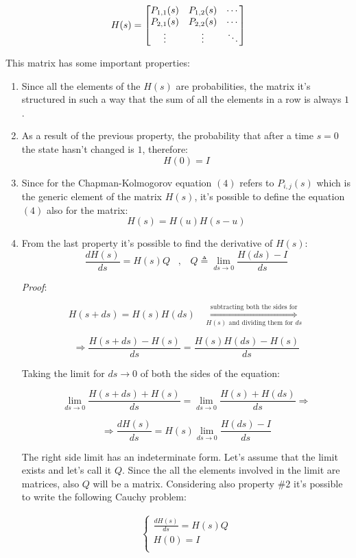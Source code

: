 \documentclass[12pt,a4paper]{article}
\begin{document}
\bigskip\noindent
$$
H(s)=\left[
\begin{matrix}
P_{1,1}(s)&P_{1,2}(s)&\cdots\cr
P_{2,1}(s)&P_{2,2}(s)&\cdots\cr
\vdots&\vdots&\ddots
\end{matrix}
\right]
$$

\bigskip\noindent
This matrix has some important properties:
\begin{enumerate}
\item Since all the elements of the $H(s)$ are probabilities, the matrix it's structured in such a way that the sum of all the elements in a row is always $1$.
\item As a result of the previous property, the probability that after a time $s=0$ the state hasn't changed is $1$, therefore:
$$
H(0)=I
$$
\item Since for the Chapman-Kolmogorov equation $(4)$ refers to $P_{i,j}(s)$ which is the generic element of the matrix $H(s)$, it's possible to define the equation $(4)$ also for the matrix:
$$
H(s)=H(u)H(s-u)
$$
\newpage
\item From the last property it's possible to find the derivative of $H(s)$:
$$
\frac{dH(s)}{ds}=H(s)Q\hspace{10pt},\hspace{10pt}Q\triangleq\lim_{ds\rightarrow 0}\frac{H(ds)-I}{ds}
$$

\noindent
\emph{Proof}:

$$
H(s+ds)=H(s)H(ds)\hspace{10pt}\overset{\textrm{subtracting both the sides for}}
{\underset{H(s) \textrm{ and dividing them for }ds}{\Rightarrow}}
$$

\medskip
$$
\Rightarrow
\frac{H(s+ds)-H(s)}{ds}=\frac{H(s)H(ds)-H(s)}{ds}
$$

\medskip
Taking the limit for $ds\rightarrow 0$ of both the sides of the equation:

$$
\lim_{ds\rightarrow 0}{\frac{H(s+ds)+H(s)}{ds}}=
\lim_{ds\rightarrow 0}{\frac{H(s)+H(ds)}{ds}} \Rightarrow
$$

\medskip
$$
\Rightarrow
\frac{dH(s)}{ds}=H(s)\lim_{ds\rightarrow 0}{\frac{H(ds)-I}{ds}}
$$

\medskip
The right side limit has an indeterminate form. Let's assume that the limit exists and let's call it $Q$. Since the all the elements involved in the limit are matrices, also $Q$ will be a matrix. Considering also property $\#2$ it's possible to write the following Cauchy problem:

\begin{Large}
$$
\begin{matrix}
\begin{cases}
\frac{dH(s)}{ds}=H(s)Q\\
H(0)=I \\
\end{cases}
\end{matrix}
$$
\end{Large}


\end{enumerate}
\end{document}
